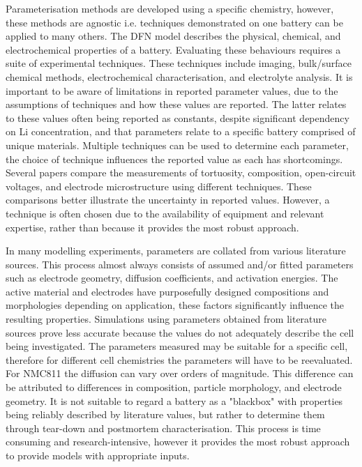 \documentclass[journal=jacsat,manuscript=article]{achemso}
\begin{document}
Parameterisation methods are developed using a specific chemistry, however, these methods are agnostic i.e. techniques demonstrated on one battery can be applied to many others. The DFN model describes the physical, chemical, and electrochemical properties of a battery. Evaluating these behaviours requires a suite of experimental techniques. These techniques include imaging, bulk/surface chemical methods, electrochemical characterisation, and electrolyte analysis. \cite{Waldmann2016} It is important to be aware of limitations in reported parameter values, due to the assumptions of techniques and how these values are reported. The latter relates to these values often being reported as constants, despite significant dependency on Li concentration, and that parameters relate to a specific battery comprised of unique materials. Multiple techniques can be used to determine each parameter, the choice of technique influences the reported value as each has shortcomings. Several papers compare the measurements of tortuosity, composition, open-circuit voltages, and electrode microstructure using different techniques. \cite{Nguyen2020, Chen2020,Landesfeind2018,Barai2019} These comparisons better illustrate the uncertainty in reported values. However, a technique is often chosen due to the availability of equipment and relevant expertise, rather than because it provides the most robust approach.

In many modelling experiments, parameters are collated from various literature sources.\cite{Kim2011} This process almost always consists of assumed and/or fitted parameters such as electrode geometry, diffusion coefficients, and activation energies.\cite{Merla2018} The active material and electrodes have purposefully designed compositions and morphologies depending on application, these factors significantly influence the resulting properties.\cite{Lain2019} Simulations using parameters obtained from literature sources prove less accurate because the values do not adequately describe the cell being investigated.\cite{Zhang2014} The parameters measured may be suitable for a specific cell, therefore for different cell chemistries the parameters will have to be reevaluated. For NMC811 the diffusion can vary over orders of magnitude.\cite{Kim2011,noh2013comparison} This difference can be attributed to differences in composition, particle morphology, and electrode geometry.\cite{Liu2008,Luo_2015, Michaelis_2019_understanding} It is not suitable to regard a battery as a "blackbox" with properties being reliably described by literature values, but rather to determine them through tear-down and postmortem characterisation. This process is time consuming and research-intensive, however it provides the most robust approach to provide models with appropriate inputs. 
\end{document}
